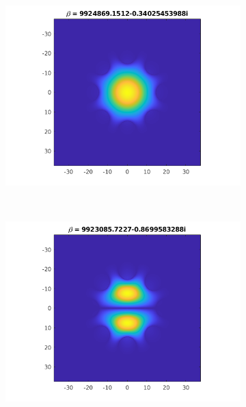 \documentclass[]{article}
\begin{document}
\begin{figure}[htb]
	\centering
	\begin{subfigure}{0.3\textwidth}
		\includegraphics[width=\textwidth]{Figures/LP01}
	\end{subfigure}
	~
	\begin{subfigure}{0.3\textwidth}
		\includegraphics[width=\textwidth]{Figures/LP11a}
	\end{subfigure}
	~
	\begin{subfigure}{0.3\textwidth}

\end{subfigure}
\end{figure}
\end{document}
